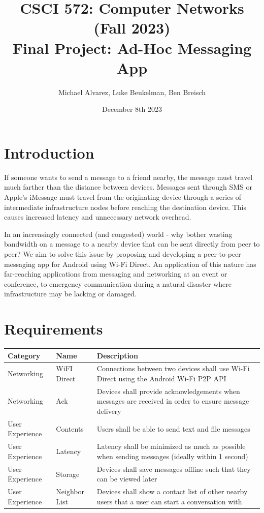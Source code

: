 \documentclass[10pt]{article}
\title{{\normalsize CSCI 572: Computer Networks (Fall 2023)}\\Final Project: Ad-Hoc Messaging App}
\author{Michael Alvarez, Luke Beukelman, Ben Breisch}
\date{December 8th 2023}
\begin{document}
\maketitle

\section{Introduction}

If someone wants to send a message to a friend nearby, the message must travel much farther than the distance between devices. Messages sent through SMS or Apple's iMessage must travel from the originating device through a series of intermediate infrastructure nodes before reaching the destination device. This causes increased latency and unnecessary network overhead.

In an increasingly connected (and congested) world - why bother wasting bandwidth on a message to a nearby device that can be sent directly from peer to peer? We aim to solve this issue by proposing and developing a peer-to-peer messaging app for Android using Wi-Fi Direct. An application of this nature has far-reaching applications from messaging and networking at an event or conference, to emergency communication during a natural disaster where infrastructure may be lacking or damaged. 

\section{Requirements}

\begin{center}
    \begin{tabular}{| p{} | p{} | p{} |}
        \hline
        Category        & Name          & Description
        \\ \hline
        Networking      & WiFI Direct   & Connections between two devices shall use Wi-Fi Direct using the Android Wi-Fi P2P API
        \\ \hline
        Networking      & Ack           & Devices shall provide acknowledgements when messages are received in order to ensure message delivery
        \\ \hline
        User Experience & Contents      & Users shall be able to send text and file messages
        \\ \hline
        User Experience & Latency       & Latency shall be minimized as much as possible when sending messages (ideally within 1 second)
        \\ \hline
        User Experience & Storage       & Devices shall save messages offline such that they can be viewed later
        \\ \hline
        User Experience & Neighbor List & Devices shall show a contact list of other nearby users that a user can start a conversation with
        \\ \hline
    \end{tabular}
\end{center}
\end{document}
